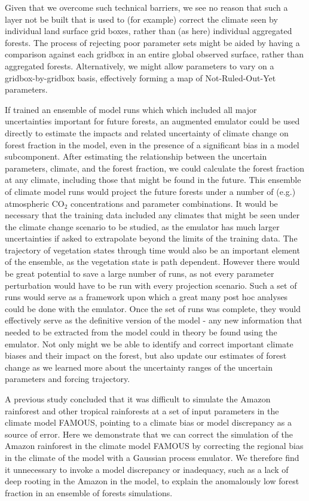 \documentclass[gmd, manuscript]{copernicus}
\begin{document}
Given that we overcome such technical barriers, we see no reason that such a layer not be built that is used to (for example) correct the climate seen by individual land surface grid boxes, rather than (as here) individual aggregated forests. The process of rejecting poor parameter sets might be aided by having a comparison against each gridbox in an entire global observed surface, rather than aggregated forests. Alternatively, we might allow parameters to vary on a gridbox-by-gridbox basis, effectively forming a map of Not-Ruled-Out-Yet parameters. 

If trained an ensemble of model runs which which included all major uncertainties important for future forests, an augmented emulator could be used directly to estimate the impacts and related uncertainty of climate change on forest fraction in the model, even in the presence of a significant bias in a model subcomponent. After estimating the relationship between the uncertain parameters, climate, and the forest fraction, we could calculate the forest fraction at any climate, including those that might be found in the future. This ensemble of climate model runs would project the future forests under a number of (e.g.) atmospheric CO$_{2}$ concentrations and parameter combinations. It would be necessary that the training data included any climates that might be seen under the climate change scenario to be studied, as the emulator has much larger uncertainties if asked to extrapolate beyond the limits of the training data. The trajectory of vegetation states through time would also be an important element of the ensemble, as the vegetation state is path dependent. However there would be great potential to save a large number of runs, as not every parameter perturbation would have to be run with every projection scenario. Such a set of runs would serve as a framework upon which a great many post hoc analyses could be done with the emulator. Once the set of runs was complete, they would effectively serve as the definitive version of the model - any new information that needed to be extracted from the model could in theory be found using the emulator. Not only might we be able to identify and correct important climate biases and their impact on the forest, but also update our estimates of forest change as we learned more about the uncertainty ranges of the uncertain parameters and forcing trajectory.

\conclusions \label{sec:conclusions}

A previous study \citep{mcneall2016impact} concluded that it was difficult to simulate the Amazon rainforest and other tropical rainforests at a set of input parameters in the climate model FAMOUS, pointing to a climate bias or model discrepancy as a source of error. Here we demonstrate that we can correct the simulation of the Amazon rainforest in the climate model FAMOUS by correcting the regional bias in the climate of the model with a Gaussian process emulator. We therefore find it unnecessary to invoke a model discrepancy or inadequacy, such as a lack of deep rooting in the Amazon in the model, to explain the anomalously low forest fraction in an ensemble of forests simulations.  
\end{document}

